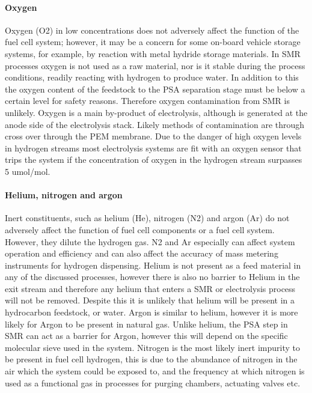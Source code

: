 \paragraph{Oxygen}
Oxygen (O2) in low concentrations does not adversely affect the function of the fuel cell system; however, 
it may be a concern for some on-board vehicle storage systems, for example, by reaction with metal hydride 
storage materials.
In SMR processes oxygen is not used as a raw material, nor is it stable during the process conditions, 
readily reacting with hydrogen to produce water. In addition to this the oxygen content of the feedstock 
to the PSA separation stage must be below a certain level for safety reasons. Therefore oxygen contamination 
from SMR is unlikely. 
Oxygen is a main by-product of electrolysis, although is generated at the anode side of the electrolysis 
stack. Likely methods of contamination are through cross over through the PEM membrane. Due to the danger 
of high oxygen levels in hydrogen streams most electrolysis systems are fit with an oxygen sensor that trips 
the system if the concentration of oxygen in the hydrogen stream surpasses 5 umol/mol. 

\paragraph{Helium, nitrogen and argon}
Inert constituents, such as helium (He), nitrogen (N2) and argon (Ar) do not adversely affect the function 
of fuel cell components or a fuel cell system. However, they dilute the hydrogen gas. N2 and Ar especially 
can affect system operation and efficiency and can also affect the accuracy of mass metering instruments for 
hydrogen dispensing.
Helium is not present as a feed material in any of the discussed processes, however there is also no barrier 
to Helium in the exit stream and therefore any helium that enters a SMR or electrolysis process will not be 
removed. Despite this it is unlikely that helium will be present in a hydrocarbon feedstock, or water.
Argon is similar to helium, however it is more likely for Argon to be present in natural gas. Unlike helium, 
the PSA step in SMR can act as a barrier for Argon, however this will depend on the specific molecular sieve 
used in the system.
Nitrogen is the most likely inert impurity to be present in fuel cell hydrogen, this is due to the abundance 
of nitrogen in the air which the system could be exposed to, and the frequency at which nitrogen is used as 
a functional gas in processes for purging chambers, actuating valves etc.


